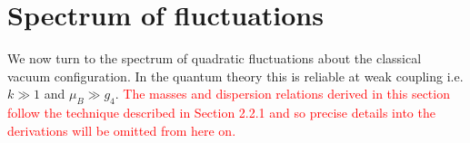 

\section{Spectrum of fluctuations}
\label{sec3}
We now turn to the spectrum of quadratic fluctuations about the classical vacuum configuration. In the quantum theory this is reliable at weak coupling i.e. $k\gg 1$ and $\mu_B\gg g_4$. \textcolor{red}{The masses and dispersion relations derived in this section follow the technique described in Section 2.2.1 and so precise details into the derivations will be omitted from here on.}
